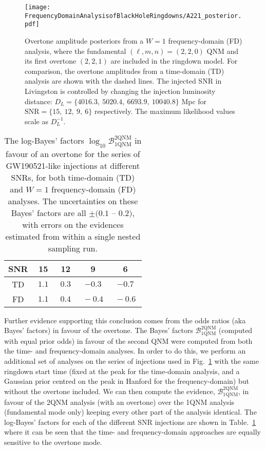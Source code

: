 \begin{figure}[t]
    \centering
    \texttt{[image: FrequencyDomainAnalysisofBlackHoleRingdowns/A221\_posterior.pdf]}
    \caption[Overtone amplitude posteriors from a $W=1$ frequency-domain analysis]{ 
    Overtone amplitude posteriors from a $W=1$ frequency-domain (FD) analysis, where the fundamental $(\ell,m,n) = (2,2,0)$ QNM and its first overtone $(2,2,1)$ are included in the ringdown model. For comparison, the overtone amplitudes from a time-domain (TD) analysis are shown with the dashed lines. The injected SNR in Livingston is controlled by changing the injection luminosity distance: $D_L = \{4016.3,\ 5020.4,\ 6693.9,\ 10040.8\}$ Mpc for $\mathrm{SNR} = \{15,\ 12,\ 9,\ 6\}$ respectively. The maximum likelihood values scale as $D_L^{-1}$.
    }
    \label{fig:A221_posterior}
\end{figure}

\begin{table}[b!]
    \centering
    \begin{tabular}{c|cccc}
    SNR & 15   & 12   & 9   & 6  \\ \hline
    TD & $~ 1.1 ~$ & $0.3$ & $-0.3$ & $-0.7$ \\
    FD & $~ 1.1 ~$ & $~ 0.4 ~$ & $~ -0.4 ~ $ & $~ -0.6 ~$   
    \end{tabular}
    \caption[The log-Bayes' factors in favour of an overtone for the series of GW190521-like injections at different SNRs, for both time-domain and $W=1$ frequency-domain analyses]{ 
    The log-Bayes' factors $\log_{10}\mathcal{B}^{2\mathrm{QNM}}_{1\mathrm{QNM}}$ in favour of an overtone for the series of GW190521-like injections at different SNRs, for both time-domain (TD) and $W=1$ frequency-domain (FD) analyses. 
    The uncertainties on these Bayes' factors are all $\pm (0.1$ -- $0.2)$, with errors on the evidences estimated from within a single nested sampling run.
    }
    \label{tab:bayes_factors}
\end{table}

Further evidence supporting this conclusion comes from the odds ratios (aka Bayes' factors) in favour of the overtone.
The Bayes' factors $\mathcal{B}^{2\mathrm{QNM}}_{1\mathrm{QNM}}$ (computed with equal prior odds) in favour of the second QNM were computed from both the time- and frequency-domain analyses. 
In order to do this, we perform an additional set of analyses on the series of injections used in Fig.~\ref{fig:A221_posterior} with the same ringdown start time (fixed at the peak for the time-domain analysis, and a Gaussian prior centred on the peak in Hanford for the frequency-domain) but without the overtone included.
We can then compute the evidence, $\mathcal{B}_{1\mathrm{QNM}}^{2\mathrm{QNM}}$, in favour of the 2QNM analysis (with an overtone) over the 1QNM analysis (fundamental mode only) keeping every other part of the analysis identical. 
The log-Bayes' factors for each of the different SNR injections are shown in Table.~\ref{tab:bayes_factors} where it can be seen that the time- and frequency-domain approaches are equally sensitive to the overtone mode.


